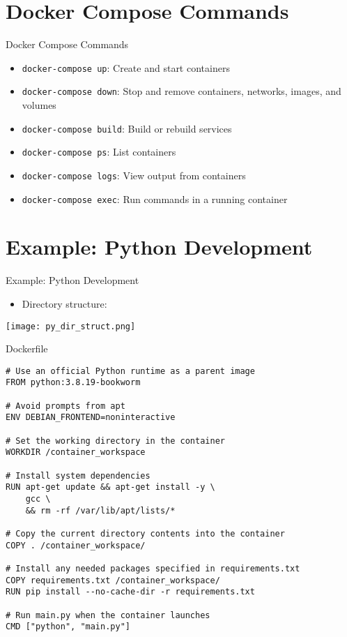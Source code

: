 \documentclass{beamer}
\begin{document}
\section{Docker Compose Commands}

\begin{frame}{Docker Compose Commands}
    \begin{itemize}
        \item \texttt{docker-compose up}: Create and start containers
        \item \texttt{docker-compose down}: Stop and remove containers, networks, images, and volumes
        \item \texttt{docker-compose build}: Build or rebuild services
        \item \texttt{docker-compose ps}: List containers
        \item \texttt{docker-compose logs}: View output from containers
        \item \texttt{docker-compose exec}: Run commands in a running container
    \end{itemize}
\end{frame}

\section{Example: Python Development}

\begin{frame}[fragile]{Example: Python Development}
    \begin{itemize}
        \item Directory structure:
    \end{itemize}
    \texttt{[image: py\_dir\_struct.png]}
\end{frame}

\begin{frame}[fragile]{Dockerfile}
    \begin{verbatim}
# Use an official Python runtime as a parent image
FROM python:3.8.19-bookworm

# Avoid prompts from apt
ENV DEBIAN_FRONTEND=noninteractive

# Set the working directory in the container
WORKDIR /container_workspace

# Install system dependencies
RUN apt-get update && apt-get install -y \
    gcc \
    && rm -rf /var/lib/apt/lists/*

# Copy the current directory contents into the container
COPY . /container_workspace/

# Install any needed packages specified in requirements.txt
COPY requirements.txt /container_workspace/
RUN pip install --no-cache-dir -r requirements.txt

# Run main.py when the container launches
CMD ["python", "main.py"]
    \end{verbatim}
\end{frame}
\end{document}
